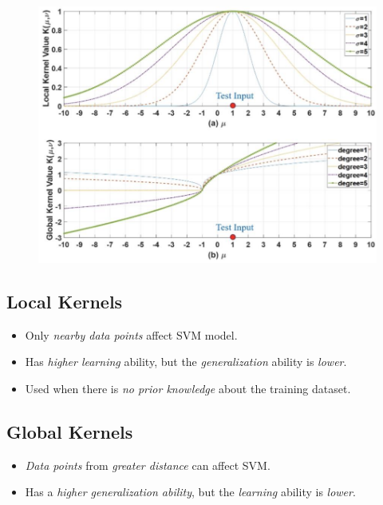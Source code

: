 \documentclass[
	number={2},
	title={Learning Linear Separators{,} SVMs and Kernels}
]{cs584notes}
\begin{document}
\begin{minipage}[m]{0.55\textwidth}
	\begin{figure}[H]
		\centering
		\includegraphics[width=\textwidth]{figures/2/kernels}
		\caption{}
		\label{fig:kernel-graphs}
	\end{figure}
	
\end{minipage}\hfill%
\begin{minipage}[m]{0.45\textwidth}
	\subsection{Local Kernels}\label{subsec:local-kernels}
	\begin{itemize}
		\item Only \emph{nearby data points} affect SVM model.
		\item Has \emph{higher learning} ability, but the \emph{generalization} ability is \emph{lower}.
		\item Used when there is \emph{no prior knowledge} about the training dataset.
	\end{itemize}

	\subsection{Global Kernels}\label{subsec:global-kernels}
	\begin{itemize}
		\item \emph{Data points} from \emph{greater distance} can affect SVM\@.
		\item Has a \emph{higher generalization ability}, but the \emph{learning} ability is \emph{lower}.
	\end{itemize}
\end{minipage}
\end{document}
